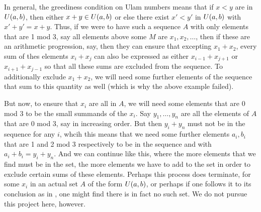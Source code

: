 \documentclass{article}
\theoremstyle{definition}
\theoremstyle{remark}
\numberwithin{equation}{section}
\begin{document}
In general, the greediness condition on Ulam numbers means that if
$x < y$ are in $U(a,b)$, then either $x+y \in U(a,b)$ or
else there exist $x' < y'$ in $U(a,b)$ with $x'+y' = x+y$.  Thus,
if we were to have such a sequence $A$ with only elements that are 1
mod 3, say all elements above some $M$ are $x_1, x_2, \ldots$, then if
these are an arithmetic progression, say, then they can ensure that
excepting $x_1 + x_2$, every sum of thes elements $x_i + x_j$ can also
be expressed as either $x_{i-1} + x_{j+1}$ or $x_{i+1}+x_{j-1}$ so
that all these sums are excluded from the sequence.  To additionally
exclude $x_1 + x_2$, we will need some further elements of the
sequence that sum to this quantity as well (which is why the above
example failed).

But now, to ensure that $x_i$ are all in $A$, we will need some
elements that are 0 mod 3 to be the small summands of the $x_i$.  Say
$y_1, \ldots, y_n$ are all the elements of $A$ that are 0 mod 3, say
in increasing order.  But then $y_i + y_n$ must not be in the sequence
for any $i$, whcih this means that we need some further elements
$a_i, b_i$ that are 1 and 2 mod 3 respectively to be in the sequence
and with $a_i+b_i = y_i + y_n$.  And we can continue like this, where
the more elements that we find must be in the set, the more elements
we have to add to the set in order to exclude certain sums of these
elements.  Perhaps this process does terminate, for some $x_i$ in an
actual set $A$ of the form $U(a,b)$, or perhaps if one follows it
to its conclusion as in \cite{schmerl:jct1994}, one might find
there is in fact no such set.  We do not pursue this project here,
however.  
\end{document}
